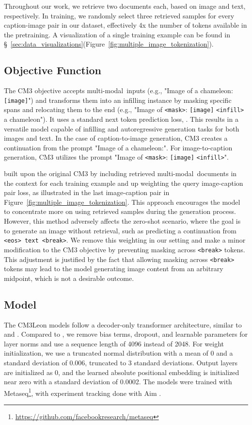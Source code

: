 \documentclass{article}
\newcommand{\model}{CM3Leon}
\newcommand{\mm}{multi-modal}
\begin{document}
Throughout our work, we retrieve two documents each, based on image and text, respectively. In training, we randomly select three retrieved samples for every caption-image pair in our dataset, effectively 4x the number of tokens available in the pretraining. A visualization of a single training example can be found in \S~\ref{sec:data_visualizations}(Figure~\ref{fig:multiple_image_tokenization}).

\subsection{Objective Function}
\label{sec:objective}
The CM3 objective accepts \mm\ inputs (e.g.,  "Image of a chameleon: \texttt{[image]}") and transforms them into an infilling instance by masking specific spans and relocating them to the end (e.g.,  "Image of \texttt{<mask>}: \texttt{[image]} \texttt{<infill>} a chameleon"). It uses a standard next token prediction loss, . This results in a versatile model capable of infilling and autoregressive generation tasks for both images and text. In the case of caption-to-image generation, CM3 creates a continuation from the prompt "Image of a chameleon:". For image-to-caption generation, CM3 utilizes the prompt "Image of \texttt{<mask>}: \texttt{[image]} \texttt{<infill>}".

\citet{RA_CM3} built upon the original CM3 by including retrieved \mm\ documents in the context for each training example and up weighting the query image-caption pair loss, as illustrated in the last image-caption pair in Figure~\ref{fig:multiple_image_tokenization}. This approach encourages the model to concentrate more on using retrieved samples during the generation process. However, this method adversely affects the zero-shot scenario, where the goal is to generate an image without retrieval, such as predicting a continuation from \texttt{<eos> text <break>}. We remove this weighting in our setting and make a minor modification to the CM3 objective by preventing masking across \texttt{<break>} tokens. This adjustment is justified by the fact that allowing masking across \texttt{<break>} tokens may lead to the model generating image content from an arbitrary midpoint, which is not a desirable outcome. 

\subsection{Model}
The \model{} models follow a decoder-only transformer architecture, similar to \citet{OPT} and \citet{gpt3}. Compared to \citet{OPT}, we remove bias terms, dropout, and learnable parameters for layer norms and use a sequence length of 4096 instead of 2048. For weight initialization, we use a truncated normal distribution with a mean of 0 and a standard deviation of 0.006, truncated to 3 standard deviations. Output layers are initialized as 0, and the learned absolute positional embedding is initialized near zero with a standard deviation of 0.0002. The models were trained with Metaseq\footnote{\url{https://github.com/facebookresearch/metaseq}}, with experiment tracking done with Aim \citet{AIM}.
\end{document}
